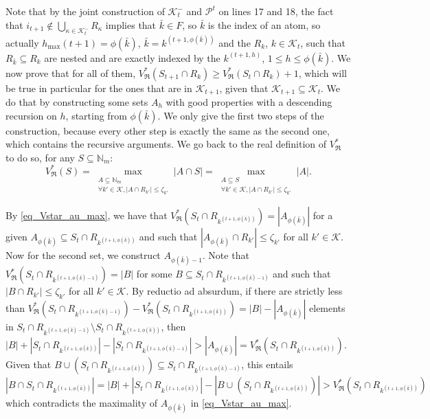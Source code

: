 \documentclass[
  11pt,
  a4paper,
]{article}
\theoremstyle{plain}
\theoremstyle{plain}
\theoremstyle{definition}
\theoremstyle{plain}
\theoremstyle{definition}
\theoremstyle{remark}
\begin{document}
Note that by the joint construction of \(\mathcal{K}^-_t\) and
\(\mathcal{P}^t\) on lines 17 and 18, the fact that
\(i_{t+1}\not\in\bigcup_{\kappa\in\mathcal{K}^-_{t}}R_{\kappa}\) implies
that \(\bar k\in F\), so \(\bar k\) is the index of an atom, so actually
\(h_{\max}(t+1)=\phi(\bar k)\), \(\bar k = k^{(t+1,\phi(\bar k))}\) and
the \(R_k\), \(k\in\mathcal{K}_{t}\), such that
\(R_{\bar k}\subseteq R_k\) are nested and are exactly indexed by the
\(k^{(t+1,h)}\), \(1\leq h\leq \phi(\bar k)\). We now prove that for all
of them,
\(V^*_{\mathfrak{R}}(S_{t+1}\cap R_k)\geq V^*_{\mathfrak{R}}(S_{t}\cap R_k)+1\),
which will be true in particular for the ones that are in
\(\mathcal{K}_{t+1}\), given that
\(\mathcal{K}_{t+1}\subseteq \mathcal{K}_t\). We do that by constructing
some sets \(A_h\) with good properties with a descending recursion on
\(h\), starting from \(\phi(\bar k)\). We only give the first two steps
of the construction, because every other step is exactly the same as the
second one, which contains the recursive arguments. We go back to the
real definition of \(V^*_{\mathfrak{R}}\) to do so, for any
\(S\subseteq \mathbb{N}_m\): \begin{equation}
\label{eq_Vstar_au_max} V^*_{\mathfrak{R}}(S)=\max_{\substack{A\subseteq \mathbb{N}_m\\\forall k'\in\mathcal{K}, |A\cap R_{k'}|\leq \zeta_{k'}}} |A\cap S| =\max_{\substack{A\subseteq S\\\forall k'\in\mathcal{K}, |A\cap R_{k'}|\leq \zeta_{k'}}} |A|  . 
\end{equation}

By \eqref{eq_Vstar_au_max}, we have that
\(V^*_{\mathfrak{R}}(S_t \cap R_{k^{(t+1,\phi(\bar k))}})=|A_{\phi(\bar k)}|\)
for a given
\(A_{\phi(\bar k)}\subseteq S_t \cap R_{k^{(t+1,\phi(\bar k))}}\) and
such that \(|A_{\phi(\bar k)}\cap R_{k'}|\leq \zeta_{k'}\) for all
\(k'\in\mathcal{K}\). Now for the second set, we construct
\(A_{\phi(\bar k)-1}\). Note that
\(V^*_{\mathfrak{R}}(S_t \cap R_{k^{(t+1,\phi(\bar k)-1)}})=|B|\) for
some \(B\subseteq S_t \cap R_{k^{(t+1,\phi(\bar k)-1)}}\) and such that
\(|B\cap R_{k'}|\leq \zeta_{k'}\) for all \(k'\in\mathcal{K}\). By
reductio ad absurdum, if there are strictly less than
\(V^*_{\mathfrak{R}}(S_t \cap R_{k^{(t+1,\phi(\bar k)-1)}}) - V^*_{\mathfrak{R}}(S_t \cap R_{k^{(t+1,\phi(\bar k))}})=|B|-|A_{\phi(\bar k)}|\)
elements in
\(S_t\cap R_{k^{(t+1,\phi(\bar k)-1)}} \setminus S_t\cap R_{k^{(t+1,\phi(\bar k))}}\),
then
\(|B|+|S_t \cap R_{k^{(t+1,\phi(\bar k))}}|-|S_t \cap R_{k^{(t+1,\phi(\bar k)-1)}}|>|A_{\phi(\bar k)}|=V^*_{\mathfrak{R}}(S_t \cap R_{k^{(t+1,\phi(\bar k))}})\).
Given that
\(B\cup (S_t\cap R_{k^{(t+1,\phi(\bar k))}})\subseteq S_t \cap R_{k^{(t+1,\phi(\bar k)-1)}}\),
this entails
\(|B\cap S_t\cap R_{k^{(t+1,\phi(\bar k))}}| =|B|+|S_t \cap R_{k^{(t+1,\phi(\bar k))}}| -| B\cup (S_t\cap R_{k^{(t+1,\phi(\bar k))}})| > V^*_{\mathfrak{R}}(S_t \cap R_{k^{(t+1,\phi(\bar k))}})\)
which contradicts the maximality of \(A_{\phi(\bar k)}\) in
\eqref{eq_Vstar_au_max}.
\end{document}
